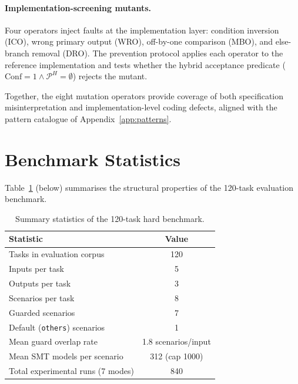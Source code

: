 \paragraph{Implementation-screening mutants.}
Four operators inject faults at the implementation layer: condition inversion
(ICO), wrong primary output (WRO), off-by-one comparison (MBO), and else-branch
removal (DRO).  The prevention protocol applies each operator to the reference
implementation and tests whether the hybrid acceptance predicate
($\mathrm{Conf} = 1 \wedge \mathcal{P}^H = \emptyset$) rejects the mutant.

Together, the eight mutation operators provide coverage of both specification
misinterpretation and implementation-level coding defects, aligned with the
pattern catalogue of Appendix~\ref{app:patterns}.

\section{Benchmark Statistics}
\label{sec:bench:stats}

Table~\ref{tab:bench:summary} (below) summarises the structural properties of the
120-task evaluation benchmark.

\begin{table}[htbp]
  \caption{Summary statistics of the 120-task hard benchmark.}
  \label{tab:bench:summary}
  \centering
  \begin{tabular}{lc}
    \toprule
    Statistic & Value \\
    \midrule
    Tasks in evaluation corpus        & 120 \\
    Inputs per task                     & 5 \\
    Outputs per task                    & 3 \\
    Scenarios per task                  & 8 \\
    Guarded scenarios                   & 7 \\
    Default (\texttt{others}) scenarios & 1 \\
    Mean guard overlap rate             & 1.8 scenarios/input \\
    Mean SMT models per scenario        & 312 (cap 1000) \\
    Total experimental runs (7 modes)   & 840 \\
    \bottomrule
  \end{tabular}
\end{table}

